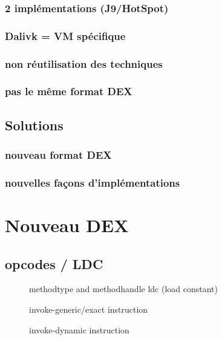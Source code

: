 \documentclass{sigplanconf}
\begin{document}
    \subsubsection{2 impl\'ementations (J9/HotSpot)}
    \subsubsection{Dalivk = VM sp\'ecifique}
    \subsubsection{non r\'eutilisation des techniques}
    \subsubsection{pas le m\^eme format DEX}

  \subsection{Solutions}

    \subsubsection{nouveau format DEX}
    \subsubsection{nouvelles fa\c cons d'impl\'ementations}

\section{Nouveau DEX}

  \subsection{opcodes / LDC}
    \begin{figure}
      \centering 
      \caption{methodtype and methodhandle ldc (load constant)}
      \label{MTMHldc}
    \end{figure}

    \begin{figure}
      \centering 
      \caption{invoke-generic/exact instruction}
      \label{INGEins}
    \end{figure}

    \begin{figure}
      \centering 
      \caption{invoke-dynamic instruction}
      \label{INDYins}
    \end{figure}
\end{document}
